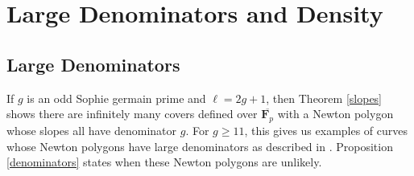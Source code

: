 \documentclass{article}
\theoremstyle{remark}
\theoremstyle{definition}
\begin{document}
\section{Large Denominators and Density}

\subsection{Large Denominators}
\par \hspace{\parindent} If $g$ is an odd Sophie germain prime and $\ell = 2g+1$, then Theorem \ref{slopes} shows there are infinitely many covers defined over $\overline{\mathbf{F}_p}$ with a Newton polygon whose slopes all have denominator $g$. For $g \geq 11$, this gives us examples of curves whose Newton polygons have large denominators as described in \cite[Expectation 8.5.4]{oort_denominators}. Proposition \ref{denominators} states when these Newton polygons are unlikely.
\end{document}
